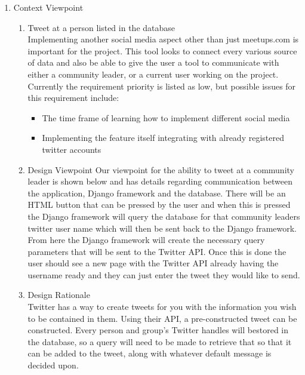 \documentclass[draftclsnofoot,10pt,onecolumn]{IEEEtran} %
\begin{document}
\begin{enumerate}
\begin{enumerate}
\begin{enumerate}
			\end{enumerate}
			
		\item Context Viewpoint \\
			\begin{enumerate}
				\item Tweet at a person listed in the database \\
				Implementing another social media aspect other than just meetups.com is important for the project. This
				tool looks to connect every various source of data and also be able to give the user a tool to communicate
				with either a community leader, or a current user working on the project. Currently the requirement priority
				is listed as low, but possible issues for this requirement include:
				\begin{itemize}
					\item The time frame of learning how to implement different social media
					\item Implementing the feature itself integrating with already registered twitter accounts \\
				\end{itemize}
				
				\item Design Viewpoint %
				Our viewpoint for the ability to tweet at a community leader is shown below and has details regarding
				communication between the application, Django framework and the database. There will be an HTML
				button that can be pressed by the user and when this is pressed the Django framework will query the
				database for that community leaders twitter user name which will then be sent back to the Django
				framework. From here the Django framework will create the necessary query parameters that will be sent to
				the Twitter API. Once this is done the user should see a new page with the Twitter API already having the
				username ready and they can just enter the tweet they would like to send. \\
				
				\item Design Rationale \\
				Twitter has a way to create tweets for you with the information you wish to be contained in them. Using
				their API, a pre-constructed tweet can be constructed. Every person and group's Twitter handles will bestored in the 						database, so a query will need to be made to retrieve that so that it can be added to the tweet,
				along with whatever default message is decided upon. \\
			\end{enumerate}
			

\end{enumerate}
\end{enumerate}
\end{document}
